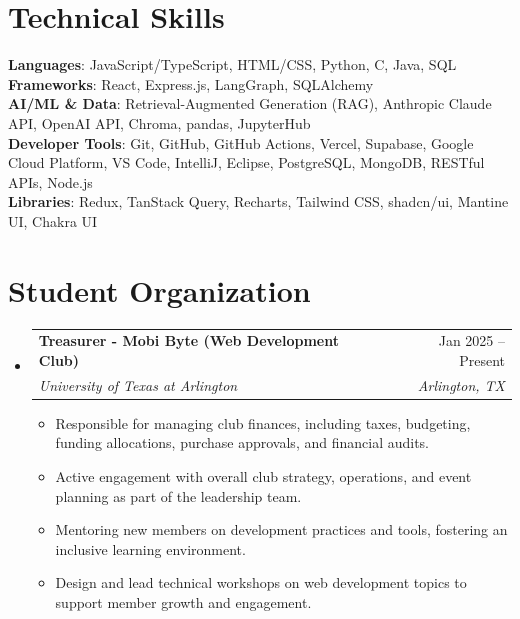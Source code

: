 \documentclass[letterpaper,10pt]{article}
\makeatletter
\newcommand{\resumeItem}[1]{
  \item\small{
    {#1 \vspace{-2pt}}
  }
}
\newcommand{\resumeSubheading}[4]{
  \vspace{-2pt}\item
    \begin{tabular*}{0.97\textwidth}[t]{l@{\extracolsep{\fill}}r}
      \textbf{#1} & #2 \\
      \textit{\small#3} & \textit{\small #4} \\
    \end{tabular*}\vspace{-7pt}
}
\newcommand{\resumeSubHeadingListStart}{\begin{itemize}[leftmargin=0.15in, label={}]}
\newcommand{\resumeSubHeadingListEnd}{\end{itemize}}
\newcommand{\resumeItemListStart}{\begin{itemize}}
\newcommand{\resumeItemListEnd}{\end{itemize}\vspace{-5pt}}
\makeatother
\begin{document}
\section{Technical Skills}
 \begin{itemize}[leftmargin=0.15in, label={}]
    \small{\item{
     \textbf{Languages}{: JavaScript/TypeScript, HTML/CSS, Python, C, Java, SQL} \\
     \textbf{Frameworks}{: React, Express.js, LangGraph, SQLAlchemy} \\
     \textbf{AI/ML \& Data}{: Retrieval-Augmented Generation (RAG), Anthropic Claude API, OpenAI API, Chroma, pandas, JupyterHub} \\
     \textbf{Developer Tools}{: Git, GitHub, GitHub Actions, Vercel, Supabase, Google Cloud Platform, VS Code, IntelliJ, Eclipse, PostgreSQL, MongoDB, RESTful APIs, Node.js} \\
     \textbf{Libraries}{: Redux, TanStack Query, Recharts, Tailwind CSS, shadcn/ui, Mantine UI, Chakra UI}
    }}
 \end{itemize}

\section{Student Organization}
  \resumeSubHeadingListStart

    \resumeSubheading
      {Treasurer - Mobi Byte (Web Development Club)}{Jan 2025 -- Present}
      {University of Texas at Arlington}{Arlington, TX}
      \resumeItemListStart
        \resumeItem{Responsible for managing club finances, including taxes, budgeting, funding allocations, purchase approvals, and financial audits.}
        \resumeItem{Active engagement with overall club strategy, operations, and event planning as part of the leadership team.}
        \resumeItem{Mentoring new members on development practices and tools, fostering an inclusive learning environment.}
        \resumeItem{Design and lead technical workshops on web development topics to support member growth and engagement.}
      \resumeItemListEnd
      \resumeSubHeadingListEnd
\end{document}

